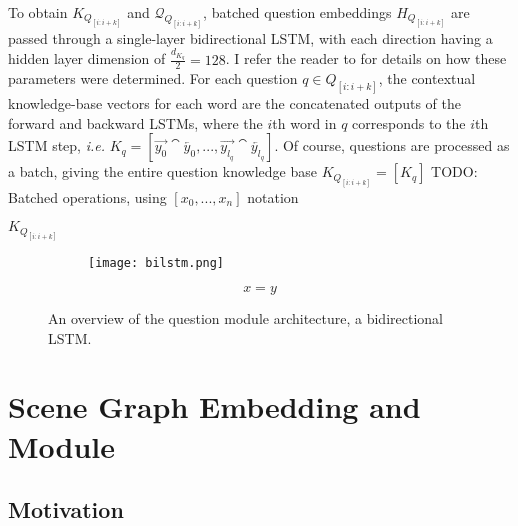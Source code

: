 To obtain \(K_{Q_{[i:i+k]}}\) and \(\mathcal{Q}_{Q_{[i:i+k]}}\), batched question embeddings \(H_{Q_{[i:i+k]}}\) are passed through a single-layer bidirectional LSTM, with each direction having a hidden layer dimension of \(\frac{d_{K_q}}{2} = 128\). I refer the reader to \sectionautorefname{ \ref{sec:hyperparameter_optimisation}} for details on how these parameters were determined. For each question \(q \in Q_{[i:i+k]}\), the contextual knowledge-base vectors for each word are the concatenated outputs of the forward and backward LSTMs, where the \(i\)th word in \(q\) corresponds to the \(i\)th LSTM step, \textit{i.e.} \(K_q = \left [ \overrightarrow{y_0} \cat \overleftarrow{y_0}, ..., \overrightarrow{y_{l_q}} \cat \overleftarrow{y_{l_q}}\right]\). Of course, questions are processed as a batch, giving the entire question knowledge base \(K_{Q_{[i:i+k]}} = [K_q]\) {\color{red} TODO: Batched operations, using \([x_0, ..., x_n]\) notation}



\(K_{Q_{[i:i+k]}}\)


\begin{figure}
    \centering
    \begin{subfigure}[l]{0.75\textwidth}
    \texttt{[image: bilstm.png]}
    \end{subfigure}
    \begin{subfigure}[r]{0.24\textwidth}
        \begin{equation}
            x = y
        \end{equation}
    \end{subfigure}
    \caption{An overview of the question module architecture, a bidirectional LSTM.}
    \label{fig:question_module_bilstm}
\end{figure}



\section{Scene Graph Embedding and Module}
\label{section:scene_graph_embedding}

\subsection{Motivation}
\label{section:scene_graph_embedding_motivation}

